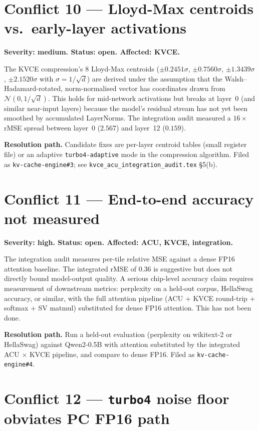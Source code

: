 \documentclass[11pt]{article}
\begin{document}
\section{Conflict 10 --- Lloyd-Max centroids vs.\ early-layer activations}
\label{sec:c10}

\textbf{Severity: medium. Status: open. Affected: KVCE.}

The KVCE compression's 8 Lloyd-Max centroids
($\pm 0.2451\sigma$, $\pm 0.7560\sigma$, $\pm 1.3439\sigma$,
$\pm 2.1520\sigma$ with $\sigma = 1/\sqrt{d}$) are derived under the
assumption that the Walsh--Hadamard-rotated, norm-normalised vector
has coordinates drawn from $\mathcal{N}(0, 1/\sqrt{d})$. This holds
for mid-network activations but breaks at layer~0 (and similar
near-input layers) because the model's residual stream has not yet
been smoothed by accumulated LayerNorms. The integration audit
measured a $16\times$ rMSE spread between layer~0 ($2.567$) and
layer~12 ($0.159$).

\textbf{Resolution path.} Candidate fixes are per-layer centroid
tables (small register file) or an adaptive
\texttt{turbo4-adaptive} mode in the compression algorithm. Filed
as \texttt{kv-cache-engine\#3}; see
\texttt{kvce\_acu\_integration\_audit.tex} \S5(b).

\section{Conflict 11 --- End-to-end accuracy not measured}
\label{sec:c11}

\textbf{Severity: high. Status: open. Affected: ACU, KVCE, integration.}

The integration audit measures per-tile relative MSE against a
dense FP16 attention baseline. The integrated rMSE of $0.36$ is
suggestive but does not directly bound model-output quality.
A serious chip-level accuracy claim requires measurement of
downstream metrics: perplexity on a held-out corpus,
HellaSwag accuracy, or similar, with the full attention pipeline
(ACU + KVCE round-trip + softmax + SV matmul) substituted for
dense FP16 attention. This has not been done.

\textbf{Resolution path.} Run a held-out evaluation
(perplexity on wikitext-2 or HellaSwag) against Qwen2-0.5B with
attention substituted by the integrated ACU $\times$ KVCE pipeline,
and compare to dense FP16. Filed as \texttt{kv-cache-engine\#4}.

\section{Conflict 12 --- \texttt{turbo4} noise floor obviates PC FP16 path}
\label{sec:c12}
\end{document}
